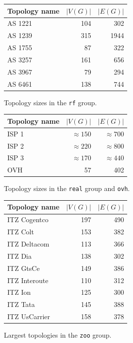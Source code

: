 
\begin{figure}
\begin{center}
\begin{tabular}{lrr}
\toprule
Topology name & $|V(G)|$ & $|E(G)|$\\
\midrule
AS 1221 & 104 & 302  \\
AS 1239 & 315 & 1944 \\
AS 1755 & 87 & 322   \\
AS 3257 & 161 & 656  \\
AS 3967 & 79 & 294   \\
AS 6461 & 138 & 744  \\
\bottomrule
\end{tabular}
\end{center}
\caption{Topology sizes in the \texttt{rf} group.}
\label{fig:rf_sizes}
\end{figure}

\begin{figure}
\begin{center}
\begin{tabular}{lrr}
\toprule
Topology name & $|V(G)|$ & $|E(G)|$\\
\midrule
ISP 1 & $\approx 150$ & $\approx 700$ \\
ISP 2 & $\approx 220$ & $\approx 800$ \\
ISP 3 & $\approx 170$ & $\approx 440$ \\
OVH   & 57 & 402 \\
\bottomrule
\end{tabular}
\end{center}
\caption{Topology sizes in the \texttt{real} group and \texttt{ovh}.}
\label{fig:real_sizes}
\end{figure}


\begin{figure}
\begin{center}
\begin{tabular}{lrr}
\toprule
Topology name & $|V(G)|$ & $|E(G)|$\\
\midrule
ITZ Cogentco  & 197 & 490 \\
ITZ Colt      & 153 & 382 \\
ITZ Deltacom  & 113 & 366 \\
ITZ Dia       & 138 & 302 \\
ITZ GtsCe     & 149 & 386 \\
ITZ Interoute & 110 & 312 \\
ITZ Ion       & 125 & 300 \\
ITZ Tata      & 145 & 388 \\
ITZ UsCarrier & 158 & 378 \\
\bottomrule
\end{tabular}
\end{center}
\caption{Largest topologies in the \texttt{zoo} group.}
\label{fig:zoo_sizes}
\end{figure}

